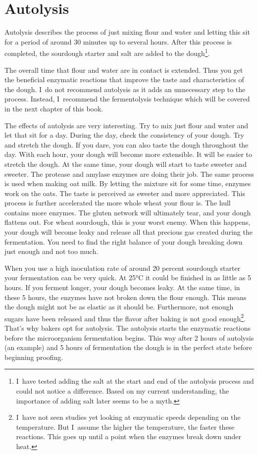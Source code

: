 \section{Autolysis}%
\label{section:autolysis}

Autolysis describes the process of just mixing flour and water and letting
this sit for a period of around 30 minutes up to several hours. After this
process is completed, the sourdough starter and salt are added to the
dough\footnote{I~have tested adding the salt at the start and end of the
autolysis process and could not notice a difference. Based on my current
understanding, the importance of adding salt later seems to be a myth.}.

The overall time that flour and water are in contact is extended. Thus you get the
beneficial enzymatic reactions that improve the taste and characteristics of the
dough. I~do not recommend autolysis as it adds an unnecessary step to the
process. Instead, I~recommend the fermentolysis technique which will be covered in the
next chapter of this book.

The effects of autolysis are very interesting. Try to mix just flour and
water and let that sit for a day. During the day, check the consistency of
your dough. Try and stretch the dough. If you dare, you can also taste the
dough throughout the day. With each hour, your dough will become
more extensible. It will be easier to stretch the dough. At the same time, your
dough will start to taste sweeter and sweeter. The protease and amylase enzymes
are doing their job. The same process is used when making oat milk. By letting
the mixture sit for some time, enzymes work on the oats. The taste is perceived as
sweeter and more appreciated. This process is further accelerated the more
whole wheat your flour is. The hull contains more enzymes. The gluten network
will ultimately tear, and your dough flattens out. For wheat sourdough, this is
your worst enemy. When this happens, your dough will become leaky and release
all that precious gas created during the fermentation. You need to find the
right balance of your dough breaking down just enough and not too much.

When you use a high inoculation rate of around 20 percent sourdough starter
your fermentation can be very quick. At 25°C it could be finished in as little as 5 hours.
If you ferment longer, your dough becomes leaky. At the same time, in
these 5 hours, the enzymes have not broken down the flour enough. This means
the dough might not be as elastic as it should be. Furthermore, not enough
sugars have been released and thus the flavor after baking is not good
enough\footnote{I~have not seen studies yet looking at enzymatic speeds depending on
the temperature. But I~assume the higher the temperature, the faster these
reactions. This goes up until a point when the enzymes break down under
heat.}. That's why bakers opt for autolysis. The autolysis starts the enzymatic
reactions before the microorganism fermentation begins. This way after 2 hours
of autolysis (an example) and 5 hours of fermentation the dough is in the
perfect state before beginning proofing.

